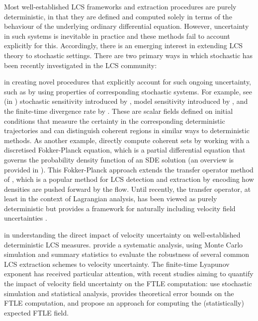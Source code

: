 Most well-established LCS frameworks and extraction procedures are purely deterministic, in that they are defined and computed solely in terms of the behaviour of the underlying ordinary differential equation.
However, uncertainty in such systems is inevitable in practice and these methods fail to account explicitly for this.
Accordingly, there is an emerging interest \citep{Balasuriya_2020_StochasticApproachesLagrangian} in extending LCS theory to stochastic settings.
There are two primary ways in which stochastic has been recently investigated in the LCS community:
\begin{romanate}
	\item in creating novel procedures that explicitly account for such ongoing uncertainty, such as by using properties of corresponding stochastic systems.
	For example, see (in ) stochastic sensitivity introduced by \citet{Balasuriya_2020_StochasticSensitivityComputable}, model sensitivity introduced by \citet{KaszasHaller_2020_UniversalUpperEstimate}, and the finite-time divergence rate by \citet{BranickiUda_2023_PathBasedDivergenceRates}.
	These are scalar fields defined on initial conditions that measure the certainty in the corresponding deterministic trajectories and can distinguish coherent regions in similar ways to deterministic methods.
	As another example, \citet{DennerEtAl_2016_ComputingCoherentSets} directly compute coherent sets by working with a discretised Fokker-Planck equation, which is a partial differential equation that governs the probability density function of an SDE solution (an overview is provided in ).
	This Fokker-Planck approach extends the transfer operator method of \citet{Froyland_2013_AnalyticFrameworkIdentifying}, which is a popular method for LCS detection and extraction by encoding how densities are pushed forward by the flow.
	Until recently, the transfer operator, at least in the context of Lagrangian analysis, has been viewed as purely deterministic but provides a framework for naturally including velocity field uncertainties \citep{Balasuriya_2020_StochasticApproachesLagrangian}.

	\item in understanding the direct impact of velocity uncertainty on well-established deterministic LCS measures.
	\citet{BadzaEtAl_2023_HowSensitiveAre} provide a systematic analysis, using Monte Carlo simulation and summary statistics to evaluate the robustness of several common LCS extraction schemes to velocity uncertainty.
	The finite-time Lyapunov exponent has received particular attention, with recent studies aiming to quantify the impact of velocity field uncertainty on the FTLE computation: \citet{GuoEtAl_2016_FiniteTimeLyapunovExponents} use stochastic simulation and statistical analysis, \citet{Balasuriya_2020_UncertaintyFinitetimeLyapunov} provides theoretical error bounds on the FTLE computation, and \citet{YouLeung_2021_ComputingFiniteTime} propose an approach for computing the (statistically) expected FTLE field.

\end{romanate}
